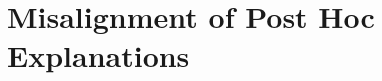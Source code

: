 \documentclass[mnsc,blindrev]{informs3}
\def\pipeline{Explanation Pipeline}
\begin{document}








\section{Misalignment of Post Hoc Explanations}
    \label{sec:misalignment}
    
\end{document}
